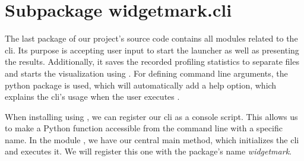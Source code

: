 \section{Subpackage widgetmark.cli}

The last package of our project's source code contains all modules related to
the \gls{cli}. Its purpose is accepting user input to start the launcher as
well as presenting the results. Additionally, it saves the recorded profiling
statistics to separate files and starts the visualization using
. For defining command line arguments, the python
package  is used, which will automatically add a
help option, which explains the \gls{cli}'s usage when the user executes
.

When installing  using
, we can register our \gls{cli} as a console
script. This allows us to make a Python function accessible from the command
line with a specific name. In the module , we have
our central main method, which initializes the \gls{cli} and executes it. We
will register this one with the package's name \emph{widgetmark}.






